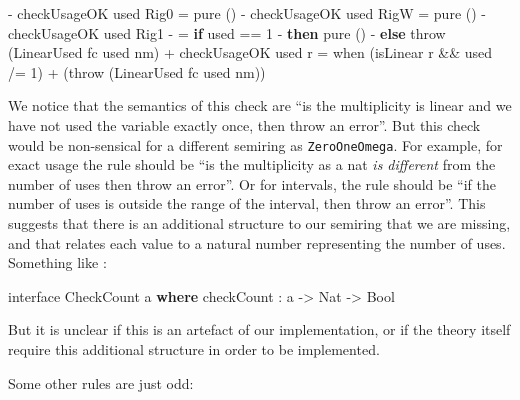 \documentclass[
]{article}
\newenvironment{Shaded}{}{}
\newcommand{\DataTypeTok}[1]{\textcolor[rgb]{0.56,0.13,0.00}{#1}}
\newcommand{\DecValTok}[1]{\textcolor[rgb]{0.25,0.63,0.44}{#1}}
\newcommand{\FunctionTok}[1]{\textcolor[rgb]{0.02,0.16,0.49}{#1}}
\newcommand{\KeywordTok}[1]{\textcolor[rgb]{0.00,0.44,0.13}{\textbf{#1}}}
\newcommand{\NormalTok}[1]{#1}
\newcommand{\OperatorTok}[1]{\textcolor[rgb]{0.40,0.40,0.40}{#1}}
\newcommand{\OtherTok}[1]{\textcolor[rgb]{0.00,0.44,0.13}{#1}}
\begin{document}
\begin{Shaded}
\begin{Highlighting}[]
\OperatorTok{{-}}\NormalTok{ checkUsageOK used }\DataTypeTok{Rig0} \OtherTok{=} \FunctionTok{pure}\NormalTok{ ()}
\OperatorTok{{-}}\NormalTok{ checkUsageOK used }\DataTypeTok{RigW} \OtherTok{=} \FunctionTok{pure}\NormalTok{ ()}
\OperatorTok{{-}}\NormalTok{ checkUsageOK used }\DataTypeTok{Rig1}
\OperatorTok{{-}}          \OtherTok{=} \KeywordTok{if}\NormalTok{ used }\OperatorTok{==} \DecValTok{1}
\OperatorTok{{-}}               \KeywordTok{then} \FunctionTok{pure}\NormalTok{ ()}
\OperatorTok{{-}}               \KeywordTok{else}\NormalTok{ throw (}\DataTypeTok{LinearUsed}\NormalTok{ fc used nm)}
\OperatorTok{+}\NormalTok{ checkUsageOK used r }\OtherTok{=}\NormalTok{ when (isLinear r }\OperatorTok{\&\&}\NormalTok{ used }\OperatorTok{/=} \DecValTok{1}\NormalTok{)}
\OperatorTok{+}\NormalTok{                            (throw (}\DataTypeTok{LinearUsed}\NormalTok{ fc used nm))}
\end{Highlighting}
\end{Shaded}

We notice that the semantics of this check are ``is the multiplicity is
linear and we have not used the variable exactly once, then throw an
error''. But this check would be non-sensical for a different semiring
as \texttt{ZeroOneOmega}. For example, for exact usage the rule should
be ``is the multiplicity as a nat \emph{is different} from the number of
uses then throw an error''. Or for intervals, the rule should be ``if
the number of uses is outside the range of the interval, then throw an
error''. This suggests that there is an additional structure to our
semiring that we are missing, and that relates each value to a natural
number representing the number of uses. Something like :

\begin{Shaded}
\begin{Highlighting}[]
\NormalTok{interface }\DataTypeTok{CheckCount}\NormalTok{ a }\KeywordTok{where}
\NormalTok{    checkCount }\OperatorTok{:}\NormalTok{ a }\OtherTok{{-}\textgreater{}} \DataTypeTok{Nat} \OtherTok{{-}\textgreater{}} \DataTypeTok{Bool}
\end{Highlighting}
\end{Shaded}

But it is unclear if this is an artefact of our implementation, or if
the theory itself require this additional structure in order to be
implemented.

Some other rules are just odd:
\end{document}
